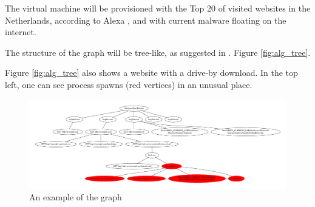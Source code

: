 The virtual machine will be provisioned with the Top 20 of visited websites in the Netherlands, according to Alexa \cite{http://www.alexa.com/topsites/countries/NL}, and with current malware floating on the internet.

The structure of the graph will be tree-like, as suggested in . Figure \ref{fig:alg_tree}.

Figure \ref{fig:alg_tree} also shows a website with a drive-by download. In the top left, one can see process spawns (red vertices) in an unusual place.

\begin{figure}[h]
    \centering
    \includegraphics[width=17cm]{Images/alg_tree}
    \caption{An example of the graph}
    \label{fig:graph}
\end{figure}

